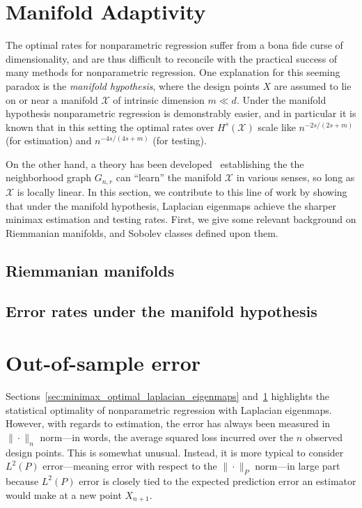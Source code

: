\documentclass{article}
\newcommand{\1}{\mathbf{1}}
\newcommand{\Xset}{\mathcal{X}}
\newcommand{\mc}[1]{\mathcal{#1}}
\theoremstyle{alden}
\theoremstyle{aldenthm}
\theoremstyle{definition}
\theoremstyle{remark}
\begin{document}
\section{Manifold Adaptivity}
\label{sec:manifold_adaptivity}

The optimal rates for nonparametric regression suffer from a bona fide curse of dimensionality, and are thus difficult to reconcile with the practical success of many methods for nonparametric regression. One explanation for this seeming paradox is the \emph{manifold hypothesis}, where the design points $X$ are assumed to lie on or near a manifold $\mc{X}$ of intrinsic dimension $m \ll d$. Under the manifold hypothesis nonparametric regression is demonstrably easier, and in particular it is known \citep{bickel2007,ariascastro2018} that in this setting the optimal rates over $H^s(\Xset)$ scale like $n^{-2s/(2s + m)}$ (for estimation) and $n^{-4s/(4s + m)}$ (for testing). 

On the other hand, a theory has been developed~\citep{belkin03,belkin05,niyogi2013} establishing the the neighborhood graph $G_{n,r}$ can ``learn'' the manifold $\Xset$ in various senses, so long as $\Xset$ is locally linear. In this section, we contribute to this line of work by showing that under the manifold hypothesis, Laplacian eigenmaps achieve the sharper minimax estimation and testing rates. First, we give some relevant background on Riemmanian manifolds, and Sobolev classes defined upon them.

\subsection{Riemmanian manifolds}

\subsection{Error rates under the manifold hypothesis}

\section{Out-of-sample error}
\label{sec:out_of_sample}
Sections~\ref{sec:minimax_optimal_laplacian_eigenmaps} and~\ref{sec:manifold_adaptivity} highlights the statistical optimality of nonparametric regression with Laplacian eigenmaps. However, with regards to estimation, the error has always been measured in $\|\cdot\|_n$ norm---in words, the average squared loss incurred over the $n$ observed design points. This is somewhat unusual. Instead, it is more typical to consider $L^2(P)$ error---meaning error with respect to the $\|\cdot\|_{P}$ norm---in large part because $L^2(P)$ error is closely tied to the expected prediction error an estimator would make at a new point $X_{n + 1}$.
\end{document}

